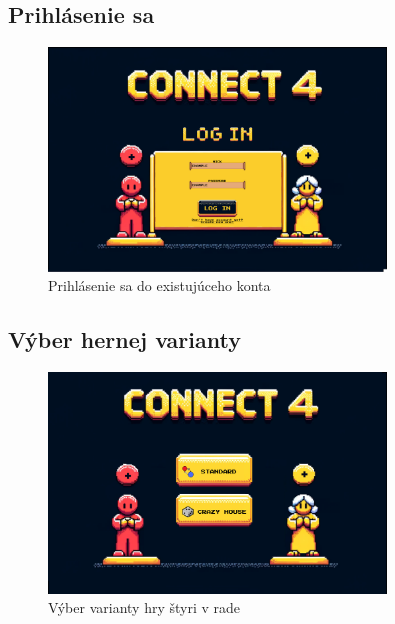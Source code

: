 \documentclass[a4paper, 11pt, onecolumn]{article}
\begin{document}
\subsection*{Prihlásenie sa}
\begin{figure}[H]
  \centering
  \includegraphics[width=0.8\textwidth]{LogIn.png}
  \caption{Prihlásenie sa do existujúceho konta}
  \label{fig:login}
\end{figure}

\subsection*{Výber hernej varianty}
\begin{figure}[H]
  \centering
  \includegraphics[width=0.8\textwidth]{PickVariant.png}
  \caption{Výber varianty hry štyri v rade}
  \label{fig:pick_variant}
\end{figure}
\end{document}
